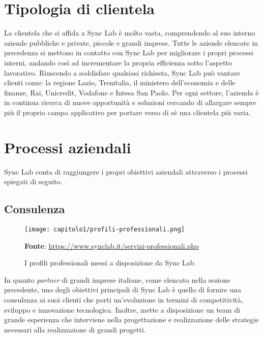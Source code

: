 \section{Tipologia di clientela}
La clientela che si affida a Sync Lab è molto vasta, comprendendo al suo interno aziende pubbliche e private, piccole e grandi imprese. Tutte le aziende elencate in precedenza si mettono in contatto con Sync Lab per migliorare i propri processi interni, andando così ad incrementare la propria efficienza sotto l'aspetto lavorativo. Riuscendo a soddisfare qualsiasi richiesta, Sync Lab può vantare clienti come: la regione Lazio, Trenitalia, il ministero dell'economia e delle finanze, Rai, Unicredit, Vodafone e Intesa San Paolo. Per ogni settore, l'azienda è in continua ricerca di nuove opportunità e soluzioni cercando di allargare sempre più il proprio campo applicativo per portare verso di sè una clientela più varia.

\section{Processi aziendali}
Sync Lab conta di raggiungere i propri obiettivi aziendali attraverso i processi spiegati di seguito.

\subsection{Consulenza}

\begin{figure}[!h]
  \centering
  \texttt{[image: capitolo1/profili-professionali.png]}
  \caption{I profili professionali messi a disposizione da Sync Lab}
  \textbf{Fonte}: \href{https://www.synclab.it/servizi-professionali.php}{https://www.synclab.it/servizi-professionali.php}
\end{figure}

In quanto \textit{partner} di grandi imprese italiane, come elencato nella sezione precedente, uno degli obiettivi principali di Sync Lab è quello di fornire una consulenza ai suoi clienti che porti un'evoluzione in termini di competitività, sviluppo e innovazione tecnologica. Inoltre, mette a disposizione un team di grande esperienza che interviene nella progettazione e realizzazione delle strategie necessari alla realizzazione di grandi progetti.

